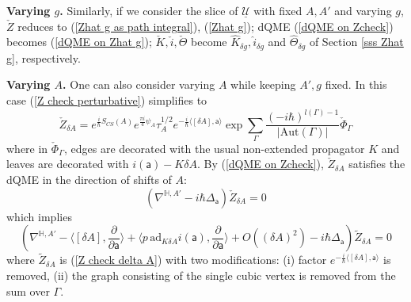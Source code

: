 \documentclass[11pt,a4paper]{amsart}
\theoremstyle{plain} %
\theoremstyle{definition}
\theoremstyle{remark}
\newcommand{\HH}{\mathbb{H}}
\newcommand{\mr}{\mathrm}
\newcommand{\sfa}{\mathsf{a}}
\newcommand{\wh}{\widehat}
\newcommand{\til}{\widetilde}
\newcommand{\mc}{\mathcal}
\newcommand{\ad}{\mathrm{ad}}
\newcommand{\UU}{\underline{\mc{U}}}
\begin{document}
{%
\textbf{Varying $g$.}
Similarly, if we consider the slice of $\UU$ with fixed $A,A'$ and varying $g$,
$\check{Z}$ reduces to (\ref{Zhat g as path integral}), (\ref{Zhat g}); dQME (\ref{dQME on Zcheck}) becomes (\ref{dQME on Zhat g}); $\check{K},\check{i},\check\Theta$ become $\wh{K}_{\delta g},\wh{i}_{\delta g}$ and $\wh\Theta_{\delta g}$ of Section \ref{sss Zhat g}, respectively.

\textbf{Varying $A$.}
One can also consider varying $A$ while keeping $A',g$ fixed. 
In this case (\ref{Z check perturbative}) simplifies to
\begin{equation}\label{Z check delta A}
    \check{Z}_{\delta A}=e^{\frac{i}{\hbar} S_{CS}(A)} e^{\frac{\pi i}{4}\psi_A}\tau_A^{1/2} e^{-\frac{i}{\hbar}
    \langle [\delta A],\sfa \rangle
    }
    \exp \sum_\Gamma \frac{(-i\hbar)^{l(\Gamma)-1}}{|\mr{Aut}(\Gamma)|} \check\Phi_\Gamma
\end{equation}
where in $\check\Phi_\Gamma$, edges are decorated with the usual non-extended propagator $K$ and leaves are decorated with $i(\sfa)-K\delta A$. By (\ref{dQME on Zcheck}), $\check{Z}_{\delta A}$ satisfies the dQME in the direction of shifts of $A$:
\begin{equation}
    (\nabla^{\HH,A'}-i\hbar \Delta_\sfa)\check{Z}_{\delta A}=0
\end{equation}
which implies
\begin{equation}\label{tilZ dQME}
     (\nabla^{\HH,A'}-\langle [\delta A],\frac{\partial}{\partial \sfa} \rangle 
     +\langle p\, \ad_{K\delta A} i(\sfa),\frac{\partial}{\partial \sfa}\rangle 
     + O((\delta A)^2) 
     -i\hbar \Delta_\sfa)\til{Z}_{\delta A}=0
\end{equation}
where $\til{Z}_{\delta A}$ is (\ref{Z check delta A}) with two modifications: (i) factor  $e^{-\frac{i}{\hbar}\langle [\delta A],\sfa \rangle}$ is removed, (ii) the  graph consisting of the single cubic vertex is removed from the sum over $\Gamma$.

}
\end{document}
